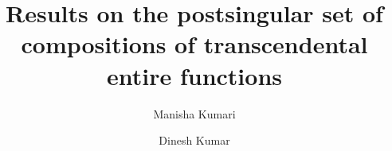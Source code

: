 \documentclass[a4paper,12pt]{amsart}
\numberwithin{equation}{section}
\begin{document}
	\title [Postsingular sets of semigroup]{Results on the postsingular set of compositions of transcendental entire functions}
	
	\author[M. Kumari]{Manisha Kumari}
	\address{Department of Mathematics, Birla Institute of Technology Mesra
		Ranchi--835 215, India}
	
	
	\author[D. Kumar]{Dinesh Kumar}
	\address{Department of Mathematics, Birla Institute of Technology Mesra
		Ranchi--835 215, India}
	
	
	
	
	
\end{document}
